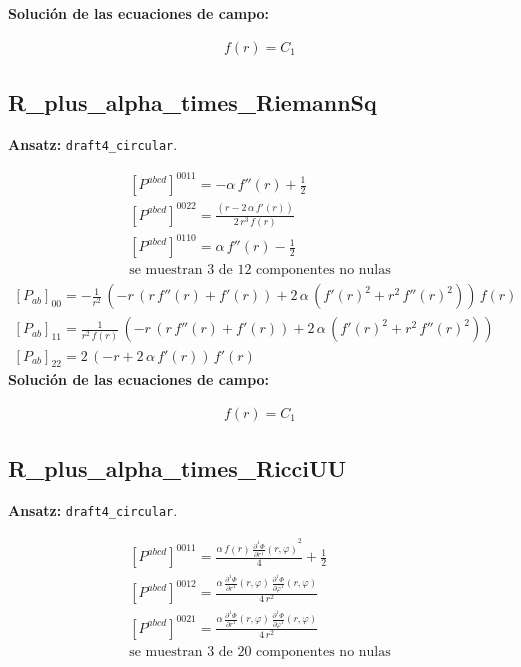 \documentclass[10pt]{article}
\begin{document}
\noindent\textbf{Solución de las ecuaciones de campo:}\par
\[\begin{aligned}f\!\left(r\right)=C_{1}\end{aligned}\]
\subsection*{R\_plus\_alpha\_times\_RiemannSq}
\textbf{Ansatz:} \texttt{draft4\_circular}.\par
\[\begin{aligned}\left[P^{abcd}\right]^{0011}=-\alpha\,f''\!\left(r\right) + \frac{1}{2}\\[2pt]\left[P^{abcd}\right]^{0022}=\frac{\left(r - 2\,\alpha\,f'\!\left(r\right)\right)}{2\,{r}^{3}\,f\!\left(r\right)}\\[2pt]\left[P^{abcd}\right]^{0110}=\alpha\,f''\!\left(r\right) - \frac{1}{2}\\[2pt]\text{se muestran 3 de 12 componentes no nulas}\end{aligned}\]
\[\begin{aligned}\left[P_{ab}\right]_{00}=-\frac{1}{{r}^{2}}\,\left(-r\,\left(r\,f''\!\left(r\right) + f'\!\left(r\right)\right) + 2\,\alpha\,\left({f'\!\left(r\right)}^{2} + {r}^{2}\,{f''\!\left(r\right)}^{2}\right)\right)\,f\!\left(r\right)\\[2pt]\left[P_{ab}\right]_{11}=\frac{1}{{r}^{2}\,f\!\left(r\right)}\,\left(-r\,\left(r\,f''\!\left(r\right) + f'\!\left(r\right)\right) + 2\,\alpha\,\left({f'\!\left(r\right)}^{2} + {r}^{2}\,{f''\!\left(r\right)}^{2}\right)\right)\\[2pt]\left[P_{ab}\right]_{22}=2\,\left(-r + 2\,\alpha\,f'\!\left(r\right)\right)\,f'\!\left(r\right)\end{aligned}\]
\noindent\textbf{Solución de las ecuaciones de campo:}\par
\[\begin{aligned}f\!\left(r\right)=C_{1}\end{aligned}\]
\subsection*{R\_plus\_alpha\_times\_RicciUU}
\textbf{Ansatz:} \texttt{draft4\_circular}.\par
\[\begin{aligned}\left[P^{abcd}\right]^{0011}=\frac{\alpha\,f\!\left(r\right)\,{\frac{\partial^{1} \Phi}{\partial r^{1}}\!\left(r, \varphi\right)}^{2}}{4} + \frac{1}{2}\\[2pt]\left[P^{abcd}\right]^{0012}=\frac{\alpha\,\frac{\partial^{1} \Phi}{\partial r^{1}}\!\left(r, \varphi\right)\,\frac{\partial^{1} \Phi}{\partial \varphi^{1}}\!\left(r, \varphi\right)}{4\,{r}^{2}}\\[2pt]\left[P^{abcd}\right]^{0021}=\frac{\alpha\,\frac{\partial^{1} \Phi}{\partial r^{1}}\!\left(r, \varphi\right)\,\frac{\partial^{1} \Phi}{\partial \varphi^{1}}\!\left(r, \varphi\right)}{4\,{r}^{2}}\\[2pt]\text{se muestran 3 de 20 componentes no nulas}\end{aligned}\]
\end{document}

